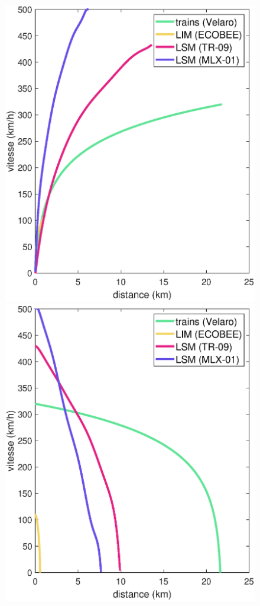 \documentclass[12pt, a4paper, onecolumn]{article}
\begin{document}
\begin{appendix}
\begin{figure}[H]
    \begin{minipage}[H]{0.49\textwidth}
      \includegraphics[width=\textwidth]{fig/Adv.eps}
    \end{minipage}
    \hfill
    \begin{minipage}[H]{0.49\textwidth}
      \includegraphics[width=\textwidth]{fig/Ddv.eps}

\end{minipage}
\end{figure}
\end{appendix}
\end{document}
